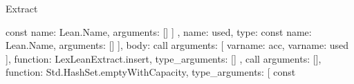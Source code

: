 \begin{lexlean}{Extract}
\begin{toolingmodule}
{{{{{{{{{{{{{{{{{{{{{{{{{                                                                                      const{
                                                                                        name: Lean.Name,
                                                                                        arguments: []
                                                                                      }
                                                                                    ]
                                                                                  }
                                                                                },
                                                                                {
                                                                                  name: used,
                                                                                  type: const{
                                                                                    name: Lean.Name,
                                                                                    arguments: []
                                                                                  }
                                                                                }
                                                                              ],
                                                                              body: call{
                                                                                arguments: [
                                                                                  var{name: acc},
                                                                                  var{name: used}
                                                                                ],
                                                                                function: LexLeanExtract.insert,
                                                                                type_arguments: []
                                                                              }
                                                                            },
                                                                            call{
                                                                              arguments: [],
                                                                              function: Std.HashSet.emptyWithCapacity,
                                                                              type_arguments: [
                                                                                const{
}}}}}}}}}}}}}}}}}}}}}}}}
\end{toolingmodule}
\end{lexlean}
